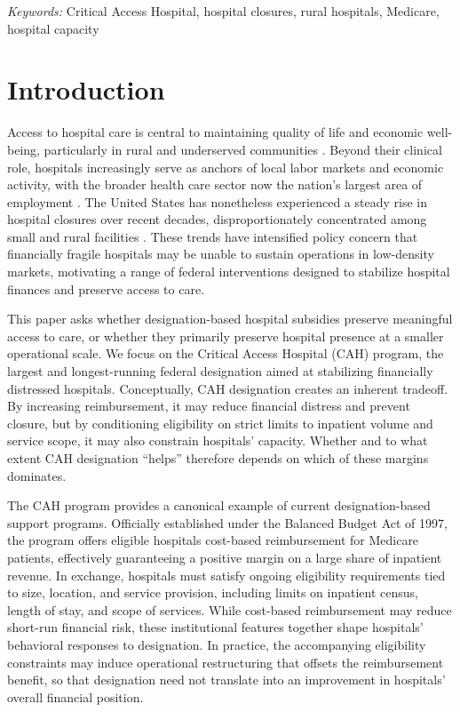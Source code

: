 \documentclass[a4paper, 12pt, twoside]{article}
\begin{document}
\noindent \textit{Keywords:} Critical Access Hospital, hospital closures, rural hospitals, Medicare, hospital capacity

\clearpage

\setcounter{page}{2}


\section{Introduction} 
\label{sec:introduction}
Access to hospital care is central to maintaining quality of life and economic well-being, particularly in rural and underserved communities \citep{ziedan2022}. Beyond their clinical role, hospitals increasingly serve as anchors of local labor markets and economic activity, with the broader health care sector now the nation's largest area of employment \citep{alexander2023}. The United States has nonetheless experienced a steady rise in hospital closures over recent decades, disproportionately concentrated among small and rural facilities \citep{kaufman2016, medpac2021}. These trends have intensified policy concern that financially fragile hospitals may be unable to sustain operations in low-density markets, motivating a range of federal interventions designed to stabilize hospital finances and preserve access to care.

This paper asks whether designation-based hospital subsidies preserve meaningful access to care, or whether they primarily preserve hospital presence at a smaller operational scale. We focus on the Critical Access Hospital (CAH) program, the largest and longest-running federal designation aimed at stabilizing financially distressed hospitals. Conceptually, CAH designation creates an inherent tradeoff. By increasing reimbursement, it may reduce financial distress and prevent closure, but by conditioning eligibility on strict limits to inpatient volume and service scope, it may also constrain hospitals' capacity. Whether and to what extent CAH designation ``helps'' therefore depends on which of these margins dominates.

The CAH program provides a canonical example of current designation-based support programs. Officially established under the Balanced Budget Act of 1997, the program offers eligible hospitals cost-based reimbursement for Medicare patients, effectively guaranteeing a positive margin on a large share of inpatient revenue. In exchange, hospitals must satisfy ongoing eligibility requirements tied to size, location, and service provision, including limits on inpatient census, length of stay, and scope of services. While cost-based reimbursement may reduce short-run financial risk, these institutional features together shape hospitals' behavioral responses to designation. In practice, the accompanying eligibility constraints may induce operational restructuring that offsets the reimbursement benefit, so that designation need not translate into an improvement in hospitals' overall financial position.
\end{document}
